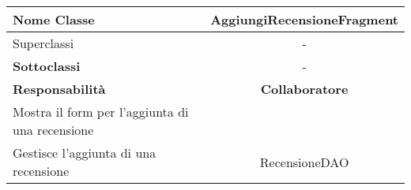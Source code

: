 
\setcounter{table}{0}
\begin{table}[H]
    \centering
    \begin{tabularx}{\textwidth}{||   X  ||  c   ||}
        \hline
        \rowcolor{Gray}
        \textbf{Nome Classe} & AggiungiRecensioneFragment\\
        \hline
        Superclassi  &  - \\
        \hline
        \textbf{Sottoclassi} & - \\
        \hline
         \textbf{Responsabilità} & \textbf{Collaboratore} \\
         \hline
          Mostra il form per l'aggiunta di una recensione &  \\
          \hline
          Gestisce l'aggiunta di una recensione & RecensioneDAO \\
         \hline
    \end{tabularx}
\end{table}
